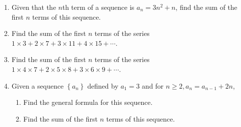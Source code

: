 \documentclass{report}
\begin{document}
\begin{enumerate}
            \item Given that the $n$th term of a sequence is $a_{n}=3 n^{2}+n$, find the sum of the first $n$ terms of this sequence.
            
            \item Find the sum of the first $n$ terms of the series $1 \times 3+2 \times 7+3 \times 11+4 \times 15+\cdots$.
            
            \item Find the sum of the first $n$ terms of the series $1 \times 4 \times 7+2 \times 5 \times 8+3 \times 6 \times 9+\cdots$.
            
            \item Given a sequence $\left\{a_{n}\right\}$ defined by $a_{1}=3$ and for $n \geq 2, a_{n}=a_{n-1}+2 n$,
            \begin{enumerate}
                \item Find the general formula for this sequence.
                \item Find the sum of the first $n$ terms of this sequence.
            \end{enumerate}
        \end{enumerate}

        \vspace{-2em}
\end{document}
